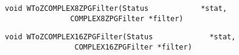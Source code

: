 \vspace{-0.1in}
\begin{verbatim}
void WToZCOMPLEX8ZPGFilter(Status            *stat,
			   COMPLEX8ZPGFilter *filter)
\end{verbatim}
\vspace{-0.1in}
\begin{verbatim}
void WToZCOMPLEX16ZPGFilter(Status             *stat,
			    COMPLEX16ZPGFilter *filter)
\end{verbatim}
